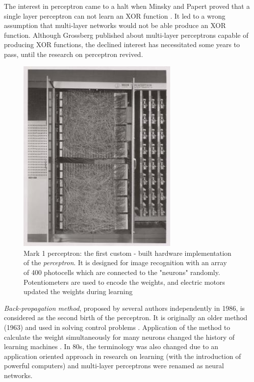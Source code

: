 The interest in perceptron came to a halt when Minsky and Papert proved that a single layer perceptron can not learn an XOR function \cite{minsky1969perceptron}.
It led to a wrong assumption that multi-layer networks would not be able produce an XOR function. Although Grossberg published about multi-layer perceptrons capable of producing XOR functions, the declined interest has necessitated some years to pass, until the research on perceptron revived.


\begin{figure}
\begin{center}
\includegraphics[width=7.9cm]{figures/Mark_I_perceptron}
\caption{Mark 1 perceptron: the first custom - built hardware implementation of the \emph{perceptron}. It is designed for image recognition with an array of 400 photocells which are connected to the "neurons" randomly.  Potentiometers are used to encode the weights, and electric motors updated the weights during learning \cite{bishop2006pattern}} 
\label{fig:Mark_I_perceptron}
\end{center}
\end{figure}

\emph{Back-propagation method}, proposed by several authors \cite{le1986learning,rumelhart1986learning} independently in 1986, is considered as the second birth of the perceptron. It is originally an older method (1963) \cite{bryson1963optimal} and used in solving control problems \cite{vapnik2013nature}. Application of the method to calculate the weight simultaneously for many neurons changed the history of learning machines \cite{vapnik2013nature}. In 80s, the terminology was also changed due to an application oriented approach in research on learning (with the introduction of powerful computers) \cite{vapnik2013nature} and multi-layer perceptrons were renamed as neural networks.

